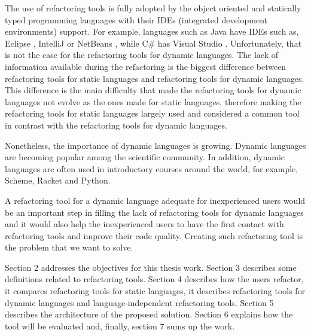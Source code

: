 The use of refactoring tools is fully adopted by the object oriented and statically typed programming languages with their IDEs (integrated development environments) support.
For example, languages such as Java have IDEs such as, Eclipse \cite{carlson2005eclipse}, IntelliJ \cite{bock2011intellij} or NetBeans \cite{boudreau2002netbeans}, while C\# has Visual Studio \cite{guckenheimer2006software}.
Unfortunately, that is not the case for the refactoring tools for dynamic languages.
The lack of information available during the refactoring is the biggest difference between refactoring tools for static languages and refactoring tools for dynamic languages.
This difference is the main difficulty that made the refactoring tools for dynamic languages not evolve as the ones made for static languages, therefore making the refactoring tools for static languages largely used and considered a common tool in contrast with the refactoring tools for dynamic languages.

Nonetheless, the importance of dynamic languages is growing. Dynamic languages are becoming popular among the scientific community.
In addition, dynamic languages are often used in introductory courses around the world, for example, Scheme, Racket and Python.

A refactoring tool for a dynamic language adequate for inexperienced users would be an important step in filling the lack of refactoring tools for dynamic languages and it would also help the inexperienced users to have the first contact with refactoring tools and improve their code quality. Creating such refactoring tool is the problem that we want to solve.



Section 2 addresses the objectives for this thesis work.
Section 3 describes some definitions related to refactoring tools.
Section 4 describes how the users refactor, it compares refactoring tools for static languages, it describes refactoring tools for dynamic languages and language-independent refactoring tools.
Section 5 describes the architecture of the proposed solution.
Section 6 explains how the tool will be evaluated and, finally, section 7 sums up the work.







